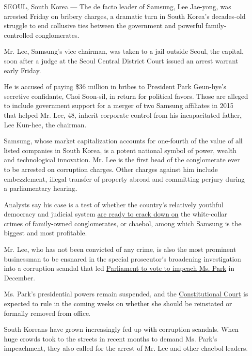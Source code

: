 SEOUL, South Korea --- The de facto leader of Samsung, Lee Jae-yong, was
arrested Friday on bribery charges, a dramatic turn in South Korea's
decades-old struggle to end collusive ties between the government and
powerful family-controlled conglomerates.

Mr. Lee, Samsung's vice chairman, was taken to a jail outside Seoul, the
capital, soon after a judge at the Seoul Central District Court issued
an arrest warrant early Friday.

He is accused of paying \$36 million in bribes to President Park
Geun-hye's secretive confidante, Choi Soon-sil, in return for political
favors. Those are alleged to include government support for a merger of
two Samsung affiliates in 2015 that helped Mr. Lee, 48, inherit
corporate control from his incapacitated father, Lee Kun-hee, the
chairman.

Samsung, whose market capitalization accounts for one-fourth of the
value of all listed companies in South Korea, is a potent national
symbol of power, wealth and technological innovation. Mr. Lee is the
first head of the conglomerate ever to be arrested on corruption
charges. Other charges against him include embezzlement, illegal
transfer of property abroad and committing perjury during a
parliamentary hearing.

Analysts say his case is a test of whether the country's relatively
youthful democracy and judicial system
\href{https://www.nytimes.com/2017/01/02/world/asia/south-korea-park-geun-hye-samsung.html?_r=0\%20//}{are
ready to crack down on} the white-collar crimes of family-owned
conglomerates, or chaebol, among which Samsung is the biggest and most
profitable.

Mr. Lee, who has not been convicted of any crime, is also the most
prominent businessman to be ensnared in the special prosecutor's
broadening investigation into a corruption scandal that led
\href{https://www.nytimes.com/2016/12/09/world/asia/south-korea-president-park-geun-hye-impeached.html}{Parliament
to vote to impeach Ms. Park} in December.

Ms. Park's presidential powers remain suspended, and the
\href{https://www.nytimes.com/2017/01/03/world/asia/south-korea-president-impeachment-trial.html}{Constitutional
Court} is expected to rule in the coming weeks on whether she should be
reinstated or formally removed from office.

South Koreans have grown increasingly fed up with corruption scandals.
When huge crowds took to the streets in recent months to demand Ms.
Park's impeachment, they also called for the arrest of Mr. Lee and other
chaebol leaders.

